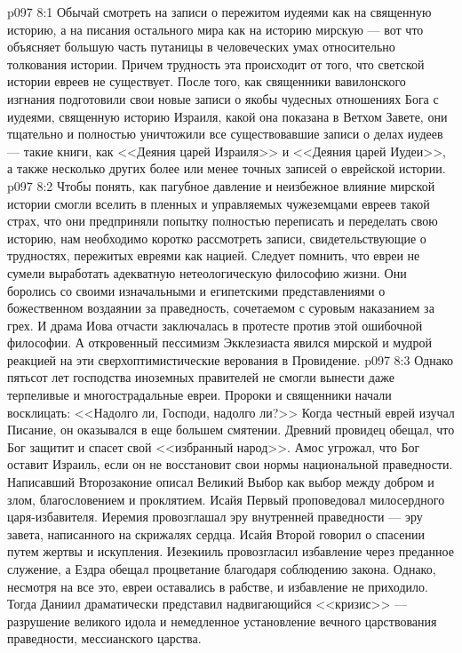 \vs p097 8:1 Обычай смотреть на записи о пережитом иудеями как на священную историю, а на писания остального мира как на историю мирскую --- вот что объясняет большую часть путаницы в человеческих умах относительно толкования истории. Причем трудность эта происходит от того, что светской истории евреев не существует. После того, как священники вавилонского изгнания подготовили свои новые записи о якобы чудесных отношениях Бога с иудеями, священную историю Израиля, какой она показана в Ветхом Завете, они тщательно и полностью уничтожили все существовавшие записи о делах иудеев --- такие книги, как <<Деяния царей Израиля>> и <<Деяния царей Иудеи>>, а также несколько других более или менее точных записей о еврейской истории.
\vs p097 8:2 Чтобы понять, как пагубное давление и неизбежное влияние мирской истории смогли вселить в пленных и управляемых чужеземцами евреев такой страх, что они предприняли попытку полностью переписать и переделать свою историю, нам необходимо коротко рассмотреть записи, свидетельствующие о трудностях, пережитых евреями как нацией. Следует помнить, что евреи не сумели выработать адекватную нетеологическую философию жизни. Они боролись со своими изначальными и египетскими представлениями о божественном воздаянии за праведность, сочетаемом с суровым наказанием за грех. И драма Иова отчасти заключалась в протесте против этой ошибочной философии. А откровенный пессимизм Экклезиаста явился мирской и мудрой реакцией на эти сверхоптимистические верования в Провидение.
\vs p097 8:3 Однако пятьсот лет господства иноземных правителей не смогли вынести даже терпеливые и многострадальные евреи. Пророки и священники начали восклицать: <<Надолго ли, Господи, надолго ли?>> Когда честный еврей изучал Писание, он оказывался в еще большем смятении. Древний провидец обещал, что Бог защитит и спасет свой <<избранный народ>>. Амос угрожал, что Бог оставит Израиль, если он не восстановит свои нормы национальной праведности. Написавший Второзаконие описал Великий Выбор как выбор между добром и злом, благословением и проклятием. Исайя Первый проповедовал милосердного царя\hyp{}избавителя. Иеремия провозглашал эру внутренней праведности --- эру завета, написанного на скрижалях сердца. Исайя Второй говорил о спасении путем жертвы и искупления. Иезекииль провозгласил избавление через преданное служение, а Ездра обещал процветание благодаря соблюдению закона. Однако, несмотря на все это, евреи оставались в рабстве, и избавление не приходило. Тогда Даниил драматически представил надвигающийся <<кризис>> --- разрушение великого идола и немедленное установление вечного царствования праведности, мессианского царства.
